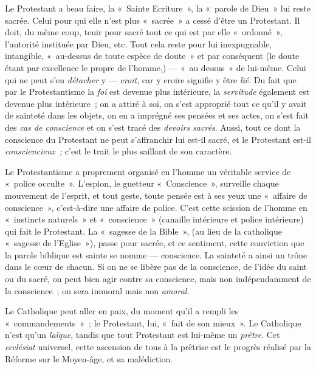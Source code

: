 \documentclass[french,twoside]{book} %
\begin{document}
Le Protestant a beau faire, la « Sainte Ecriture », la « parole de Dieu » lui reste sacrée. Celui pour qui elle n’est plus « sacrée » a cessé d’être un Protestant. Il doit, du même coup, tenir pour sacré tout ce qui est par elle « ordonné », l’autorité instituée par Dieu, etc. Tout cela reste pour lui inexpugnable, intangible, « au-dessus de toute espèce de doute » et par conséquent (le doute étant par excellence le propre de l’homme,) — « au dessus » de lui-même. Celui qui ne peut s’en \emph{détacher} y — \emph{croit}, car y croire signifie y être \emph{lié}. Du fait que par le Protestantisme la \emph{foi} est devenue plus intérieure, la \emph{servitude} également est devenue plus intérieure ; on a attiré à soi, on s’est approprié tout ce qu’il y avait de sainteté dans les objets, on en a imprégné ses pensées et ses actes, on s’est fait des \emph{cas de conscience} et on s’est tracé des \emph{devoirs sacrés}. Aussi, tout ce dont la conscience du Protestant ne peut s’affranchir lui est-il sacré, et le Protestant est-il \emph{consciencieux ;} c’est le trait le plus saillant de son caractère.\par
Le Protestantisme a proprement organisé en l’homme un véritable service de « police occulte ».  L’espion, le guetteur « Conscience », surveille chaque mouvement de l’esprit, et tout geste, toute pensée est à ses yeux une « affaire de conscience », c’est-à-dire une affaire de police. C’est cette scission de l’homme en « instincts naturels » et « conscience » (canaille intérieure et police intérieure) qui fait le Protestant. La « sagesse de la Bible », (au lieu de la catholique « sagesse de l’Eglise »), passe pour sacrée, et ce sentiment, cette conviction que la parole biblique est sainte se nomme — conscience. La sainteté a ainsi un trône dans le cœur de chacun. Si on ne se libère pas de la conscience, de l’idée du saint ou du sacré, on peut bien agir contre sa conscience, mais non indépendamment de la conscience ; on sera immoral mais non \emph{amoral}.\par
Le Catholique peut aller en paix, du moment qu’il a rempli les « commandements » ; le Protestant, lui, « fait de son mieux ». Le Catholique n’est qu’un \emph{laïque}, tandis que tout Protestant est lui-même un \emph{prêtre}. Cet \emph{ecclésiat} universel, cette ascension de tous à la prêtrise est le progrès réalisé par la Réforme sur le Moyen-âge, et sa malédiction.\par
\end{document}

